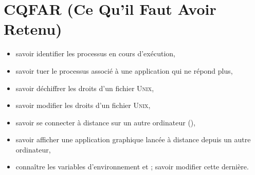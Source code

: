 \documentclass[11pt,a4paper]{article}
\newcommand{\unix}{\textsc{Unix}}
\begin{document}
\section{CQFAR (Ce Qu'il Faut Avoir Retenu)}

\begin{itemize}
 \item savoir identifier les processus en cours d'exécution,
 \item savoir tuer le processus associé à une application qui ne répond plus,
 \item savoir déchiffrer les droits d'un fichier \unix,
 \item savoir modifier les droits d'un fichier \unix,
 \item savoir se connecter à distance sur un autre ordinateur (),
 \item savoir afficher une application graphique lancée à distance depuis
       un autre ordinateur,
 \item connaître les variables d'environnement  et
        ; savoir modifier cette dernière.
\end{itemize}
\end{document}
